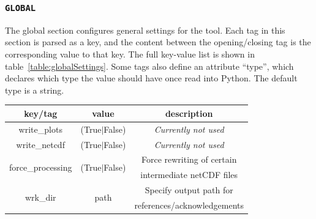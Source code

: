 \documentclass[12pt]{article}
\begin{document}
\subsubsection{\texttt{GLOBAL}}\label{subsubsection:global}
The global section configures general settings for the tool. Each tag
in this section is parsed as a key, and the content between the
opening/closing tag is the corresponding value to that key. The full
key-value list is shown in
table~\ref{table:globalSettings}. Some
tags also define an attribute ``type'', which declares which type the
value should have once read into Python. The default type is a string.
%
%
\begin{table}
\begin{center}
\begin{tabular}{|c|c|c|}
\hline
\textbf{key/tag}&\textbf{value}&\textbf{description}\\
\hline
write\_plots      & (True$|$False) & \emph{Currently not used}\\
\hline
write\_netcdf     & (True$|$False)     & \emph{Currently not used}\\
\hline

\multirow{2}{*}{force\_processing} & \multirow{2}{*}{(True$|$False)}  & Force rewriting of certain\\
                                   &                                  & intermediate netCDF files\\
\hline

\multirow{2}{*}{wrk\_dir}     & \multirow{2}{*}{path}     & Specify output path for\\
                              &                           & references/acknowledgements\\
\hline


\end{tabular}
\end{center}
\end{table}
\end{document}
